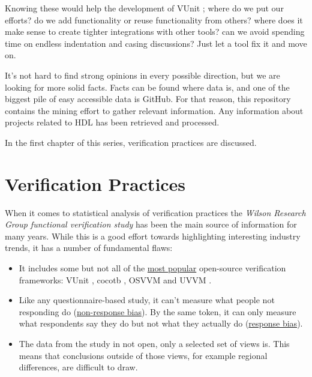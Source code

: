 \documentclass[]{article}
\providecommand{\tightlist}{%
  \setlength{\itemsep}{0pt}\setlength{\parskip}{0pt}}
\begin{document}
Knowing these would help the development of VUnit \autocite{vunit}; where do we put our efforts? do we add functionality or reuse functionality from others? where does it make sense to create tighter integrations with other tools? can we avoid spending time on endless indentation and casing discussions? Just let a tool fix it and move on.

It's not hard to find strong opinions in every possible direction, but we are looking for more solid facts. Facts can be found where data is, and one of the biggest pile of easy accessible data is GitHub. For that reason, this repository contains the mining effort to gather relevant information. Any information about projects related to HDL has been retrieved and processed.

In the first chapter of this series, verification practices are discussed.

\hypertarget{verification-practices}{%
\section{Verification Practices}\label{verification-practices}}

When it comes to statistical analysis of verification practices the \emph{Wilson Research Group functional verification study} \autocite{wilson14} \autocite{wilson16} \autocite{wilson18} has been the main source of information for many years. While this is a good effort towards highlighting interesting industry trends, it has a number of fundamental flaws:

\begin{itemize}
\tightlist
\item
  It includes some but not all of the \href{https://star-history.t9t.io/\#vunit/vunit\&osvvm/osvvm\&cocotb/cocotb\&UVVM/UVVM}{most popular} open-source verification frameworks: VUnit \autocite{vunit}, cocotb \autocite{cocotb}, OSVVM \autocite{osvvm} and UVVM \autocite{uvvm}.
\item
  Like any questionnaire-based study, it can't measure what people not responding do (\href{https://en.wikipedia.org/wiki/Participation_bias}{non-response bias}). By the same token, it can only measure what respondents say they do but not what they actually do (\href{https://en.wikipedia.org/wiki/Response_bias}{response bias}).
\item
  The data from the study in not open, only a selected set of views is. This means that conclusions outside of those views, for example regional differences, are difficult to draw.
\end{itemize}
\end{document}
